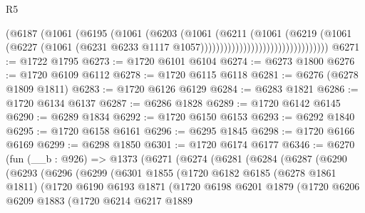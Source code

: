 \begin{lexlean}{R5}
\begin{coremodule}
                                            (@6187
                                              (@1061
                                                (@6195
                                                  (@1061
                                                    (@6203
                                                      (@1061
                                                        (@6211
                                                          (@1061
                                                            (@6219
                                                              (@1061
                                                                (@6227
                                                                  (@1061
                                                                    (@6231
                                                                      @6233
                                                                      @1117
                                                                      @1057)))))))))))))))))))))))))))))))))
@6271 := @1722 @1795
@6273 := @1720 @6101 @6104
@6274 := @6273 @1800
@6276 := @1720 @6109 @6112
@6278 := @1720 @6115 @6118
@6281 := @6276 (@6278 @1809 @1811)
@6283 := @1720 @6126 @6129
@6284 := @6283 @1821
@6286 := @1720 @6134 @6137
@6287 := @6286 @1828
@6289 := @1720 @6142 @6145
@6290 := @6289 @1834
@6292 := @1720 @6150 @6153
@6293 := @6292 @1840
@6295 := @1720 @6158 @6161
@6296 := @6295 @1845
@6298 := @1720 @6166 @6169
@6299 := @6298 @1850
@6301 := @1720 @6174 @6177
@6346 := @6270
    (fun (__b : @926) =>
    @1373
      (@6271
        (@6274
          (@6281
            (@6284
              (@6287
                (@6290
                  (@6293
                    (@6296
                      (@6299
                        (@6301
                          @1855
                          (@1720
                            @6182
                            @6185
                            (@6278 @1861 @1811)
                            (@1720
                              @6190
                              @6193
                              @1871
                              (@1720
                                @6198
                                @6201
                                @1879
                                (@1720
                                  @6206
                                  @6209
                                  @1883
                                  (@1720
                                    @6214
                                    @6217
                                    @1889

\end{coremodule}
\end{lexlean}
